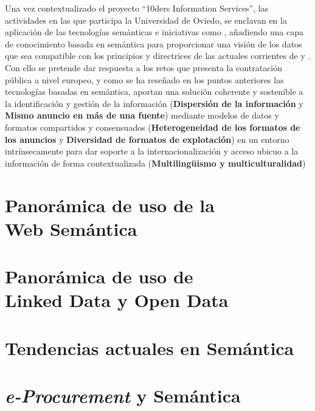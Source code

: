 \documentclass[a4paper,twoside,12pt]{report}
\begin{document}
Una vez contextualizado el proyecto ``10ders Information Services'', las actividades en las que 
participa la Universidad de Oviedo, se enclavan en la aplicación de las tecnologías semánticas
e iniciativas como \linkeddata, añadiendo una capa de conocimiento basada en semántica para proporcionar
una visión de los datos que sea compatible con los principios y directrices de las 
actuales corrientes de \opendata y \linkeddata. Con ello se pretende dar respuesta a los retos
que presenta la contratación pública a nivel europeo, y como se ha reseñado en los puntos anteriores las tecnologías
basadas en semántica, aportan una solución coherente y sostenible a la identificación y gestión de la información 
(\textbf{Dispersión de la información} y \textbf{Mismo anuncio en más de una fuente}) mediante modelos de datos y formatos
compartidos y consensuados (\textbf{Heterogeneidad de los formatos de los anuncios} y \textbf{Diversidad de formatos de explotación}) en un entorno
intrínsecamente para dar soporte a la internacionalización y acceso ubicuo a la información de forma
contextualizada (\textbf{Multilingüismo y multiculturalidad})

\chapter{\label{capitulo:semantica}Panorámica de uso de la\\ Web Semántica} 

\chapter{\label{capitulo:semantica}Panorámica de uso de \\ Linked Data y Open Data} 

\chapter{\label{capitulo:eproc-sm}Tendencias actuales en Semántica} 

\chapter{\label{capitulo:eproc-sm}\textit{e-Procurement} y Semántica} 


\printindex
\printglossaries


\insertbibliography
\end{document}
